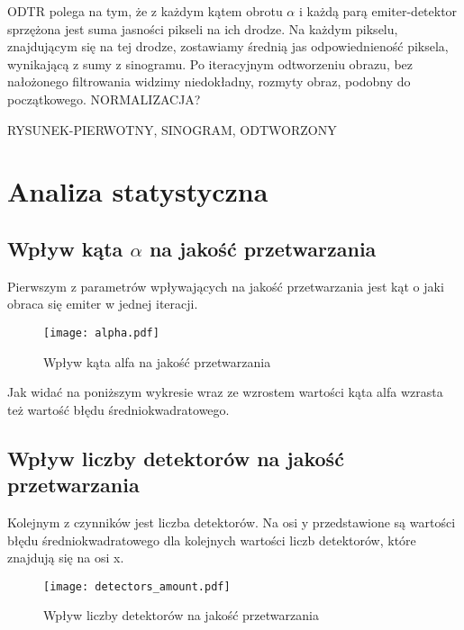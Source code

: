 \documentclass{article}
\begin{document}
ODTR polega na tym, że z każdym kątem obrotu $\alpha$ i każdą parą emiter-detektor sprzężona jest suma jasności pikseli na ich drodze. Na każdym pikselu, znajdującym się na tej drodze, zostawiamy średnią jas odpowiednieność piksela, wynikającą z sumy z sinogramu. Po iteracyjnym odtworzeniu obrazu, bez nałożonego filtrowania widzimy niedokładny, rozmyty obraz, podobny do początkowego. NORMALIZACJA? 

RYSUNEK-PIERWOTNY, SINOGRAM, ODTWORZONY

\clearpage %


\section{Analiza statystyczna}
\label{sec_analiza_statystyczna}

\subsection{Wpływ kąta $\alpha$ na jakość przetwarzania}
\label{subsec_alpha_comparison}

Pierwszym z parametrów wpływających na jakość przetwarzania jest kąt o jaki obraca się emiter w jednej iteracji. 

\begin{figure}[!htbp]
\begin{center}
\texttt{[image: alpha.pdf]}
\end{center}
\caption{Wpływ kąta alfa na jakość przetwarzania}
\label{fig:detectors_amount}
\end{figure}

Jak widać na poniższym wykresie wraz ze wzrostem wartości kąta alfa wzrasta też wartość błędu średniokwadratowego. 


\subsection{Wpływ liczby detektorów na jakość przetwarzania}
\label{subsec_detectors_amount_comparison}

Kolejnym z czynników jest liczba detektorów. Na osi y przedstawione są wartości błędu średniokwadratowego dla kolejnych wartości liczb detektorów, które znajdują się na osi x. 

\begin{figure}[!htbp]
\begin{center}
\texttt{[image: detectors\_amount.pdf]}
\end{center}
\caption{Wpływ liczby detektorów na jakość przetwarzania}
\label{fig:detectors_amount}
\end{figure}
\end{document}
